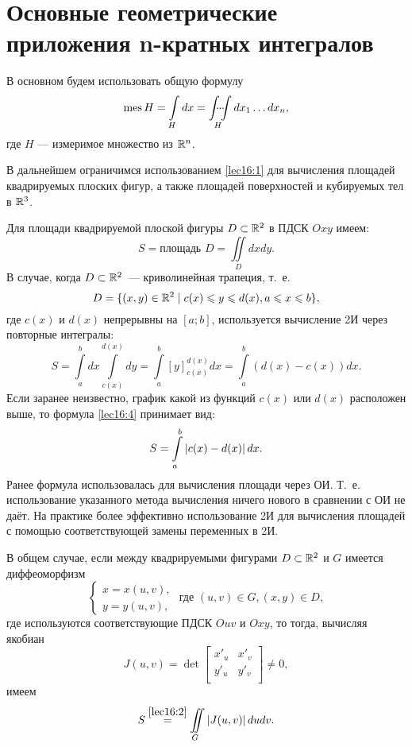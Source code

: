 \documentclass[../../main.tex]{subfiles}
\begin{document}
\section{Основные геометрические приложения n-кратных интегралов}

В основном будем использовать общую формулу
\begin{equation}
\label{lec16:1}
\operatorname{mes} H = \int\limits_Hdx = \idotsint\limits_H dx_1 \ldots dx_n,
\end{equation}
где $H$ --- измеримое множество из $\mathbb{R}^n$.

В дальнейшем ограничимся
использованием \eqref{lec16:1} для вычисления площадей квадрируемых плоских
фигур, а также площадей поверхностей и кубируемых тел в $\mathbb{R}^{3}$.

Для площади квадрируемой плоской фигуры $D \subset \mathbb{R}^{2}$ в ПДСК
$Oxy$ имеем:
\begin{equation}
\label{lec16:2}
S = \text{площадь } D = \iint\limits_Ddxdy.
\end{equation}
В случае, когда $D \subset \mathbb{R}^{2}$~--- криволинейная трапеция, т.~е. 
\begin{equation}
\label{lec16:3}
	D=\{
	(x,y)\in \mathbb{R}^2 \mid c(x)\leqslant y\leqslant d(x), a\leqslant x \leqslant b
	\},
\end{equation}
где $c(x)$ и $d(x)$ непрерывны на $\left[a; b\right]$,
 используется вычисление 2И через повторные интегралы:
\begin{equation}
\label{lec16:4}
S = \int\limits_a^bdx\int\limits_{c(x)}^{d(x)}dy = 
\int\limits_a^b\left[y\right]^{d(x)}_{c(x)}dx
=\int\limits_a^b(d(x) - c(x))dx.
\end{equation}
Если заранее неизвестно, график какой из функций $c(x)$ или $d(x)$ 
расположен выше, то формула \eqref{lec16:4} принимает вид:
\begin{equation}
\label{lec16:5}
S =  \int\limits_a^b\left|{c(x) - d(x)}\right|dx.
\end{equation}
Ранее формула использовалась для вычисления
 площади через ОИ. Т.~е. использование
  указанного метода вычисления {ничего нового}
в сравнении с ОИ не даёт. На практике
 более эффективно использование 2И для
  вычисления площадей с помощью соответствующей замены переменных в 2И.


В общем случае, если между квадрируемыми фигурами 
$D\subset \mathbb{R}^2$ и $G$ имеется диффеоморфизм
\begin{equation*}
\begin{cases}
x = x(u, v), \\
y = y(u, v),
\end{cases}
\text{ где }  (u, v) \in G, (x, y) \in D,
\end{equation*}
где используются соответствующие ПДСК $Ouv$ и $Oxy$, 
то тогда, вычисляя якобиан
\begin{equation*}
J(u,v) = \det
\begin{bmatrix}
x'_u & x'_v\\
y'_u & y'_v\\
\end{bmatrix}
\neq 0,
\end{equation*}
имеем
\begin{equation}
\label{lec16:6}
S \overset{\eqref{lec16:2}}{=} \iint\limits_G \left|{ J(u,v)}\right| dudv.
\end{equation}
\end{document}
